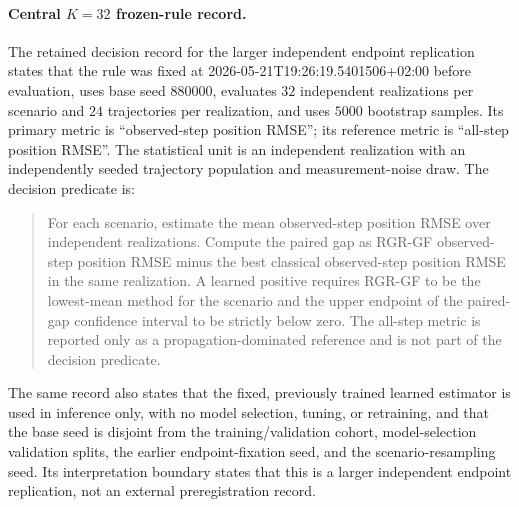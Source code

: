 \documentclass{article}
\begin{document}
\paragraph{Central $K=32$ frozen-rule record.}
The retained decision record for the larger independent endpoint replication states that the rule was fixed at 2026-05-21T19:26:19.5401506+02:00 before evaluation, uses base seed 880000, evaluates $32$ independent realizations per scenario and $24$ trajectories per realization, and uses $5000$ bootstrap samples. Its primary metric is ``observed-step position RMSE''; its reference metric is ``all-step position RMSE''. The statistical unit is an independent realization with an independently seeded trajectory population and measurement-noise draw. The decision predicate is:
\begin{quote}\small
For each scenario, estimate the mean observed-step position RMSE over independent realizations. Compute the paired gap as RGR-GF observed-step position RMSE minus the best classical observed-step position RMSE in the same realization. A learned positive requires RGR-GF to be the lowest-mean method for the scenario and the upper endpoint of the paired-gap confidence interval to be strictly below zero. The all-step metric is reported only as a propagation-dominated reference and is not part of the decision predicate.
\end{quote}
The same record also states that the fixed, previously trained learned estimator is used in inference only, with no model selection, tuning, or retraining, and that the base seed is disjoint from the training/validation cohort, model-selection validation splits, the earlier endpoint-fixation seed, and the scenario-resampling seed. Its interpretation boundary states that this is a larger independent endpoint replication, not an external preregistration record.
\end{document}
